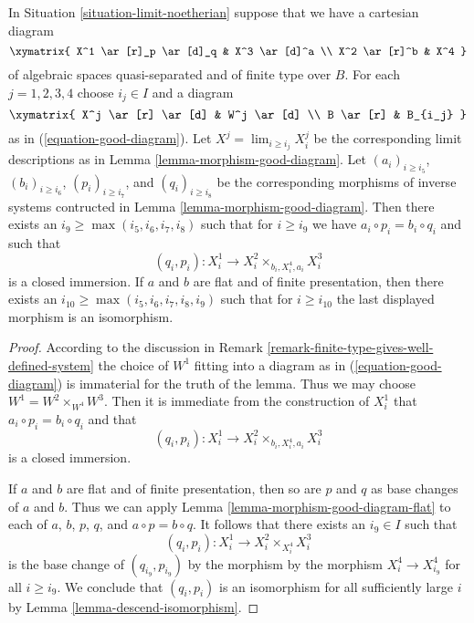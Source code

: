 \begin{lemma}
\label{lemma-good-diagram-fibre-product}
In Situation \ref{situation-limit-noetherian} suppose that we have a
cartesian diagram
$$
\xymatrix{
X^1 \ar[r]_p \ar[d]_q & X^3 \ar[d]^a \\
X^2 \ar[r]^b & X^4
}
$$
of algebraic spaces quasi-separated and of finite type over $B$.
For each $j = 1, 2, 3, 4$ choose $i_j \in I$ and a diagram
$$
\xymatrix{
X^j \ar[r] \ar[d] & W^j \ar[d] \\
B \ar[r] & B_{i_j}
}
$$
as in (\ref{equation-good-diagram}). Let
$X^j = \lim_{i \geq i_j} X^j_i$ be the corresponding limit descriptions
as in Lemma \ref{lemma-morphism-good-diagram}.
Let $(a_i)_{i \geq i_5}$, $(b_i)_{i \geq i_6}$, $(p_i)_{i \geq i_7}$, and
$(q_i)_{i \geq i_8}$ be the corresponding morphisms of inverse systems
contructed in Lemma \ref{lemma-morphism-good-diagram}. Then there exists an
$i_9 \geq \max(i_5, i_6, i_7, i_8)$ such that for $i \geq i_9$ we have
$a_i \circ p_i = b_i \circ q_i$ and such that
$$
(q_i, p_i) : X^1_i \longrightarrow X^2_i \times_{b_i, X^4_i, a_i} X^3_i
$$
is a closed immersion.
If $a$ and $b$ are flat and of finite presentation, then there exists an
$i_{10} \geq \max(i_5, i_6, i_7, i_8, i_9)$ such that for $i \geq i_{10}$
the last displayed morphism is an isomorphism.
\end{lemma}

\begin{proof}
According to the discussion in
Remark \ref{remark-finite-type-gives-well-defined-system}
the choice of $W^1$ fitting into a diagram as in
(\ref{equation-good-diagram}) is immaterial for the truth of
the lemma. Thus we may choose $W^1 = W^2 \times_{W^4} W^3$.
Then it is immediate from the construction of $X^1_i$ that 
$a_i \circ p_i = b_i \circ q_i$ and that
$$
(q_i, p_i) : X^1_i \longrightarrow X^2_i \times_{b_i, X^4_i, a_i} X^3_i
$$
is a closed immersion.

\medskip\noindent
If $a$ and $b$ are flat and of finite presentation, then so are
$p$ and $q$ as base changes of $a$ and $b$. Thus we can apply
Lemma \ref{lemma-morphism-good-diagram-flat}
to each of $a$, $b$, $p$, $q$, and $a \circ p = b \circ q$.
It follows that there exists an $i_9 \in I$ such that
$$
(q_i, p_i) : X^1_i \to X^2_i \times_{X^4_i} X^3_i
$$
is the base change of $(q_{i_9}, p_{i_9})$ by the morphism
by the morphism $X^4_i \to X^4_{i_9}$ for all $i \geq i_9$.
We conclude that $(q_i, p_i)$ is an isomorphism for all sufficiently
large $i$ by Lemma \ref{lemma-descend-isomorphism}.
\end{proof}



















